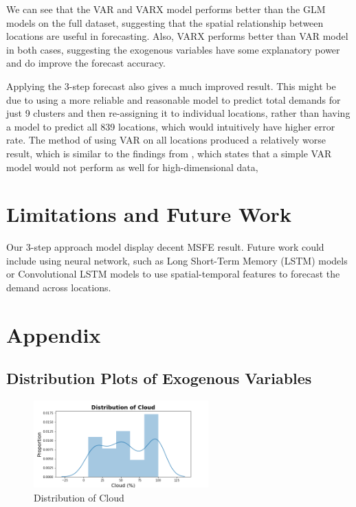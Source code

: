\documentclass[12pt, letterpaper] {article}
\begin{document}
\noindent We can see that the VAR and VARX model performs better than the GLM models on the full dataset, suggesting that the spatial relationship between locations are useful in forecasting. Also, VARX performs better than VAR model in both cases, suggesting the exogenous variables have some explanatory power and do improve the forecast accuracy. 

\noindent Applying the 3-step forecast also gives a much improved result. This might be due to using a more reliable and reasonable model to predict total demands for just 9 clusters and then re-assigning it to individual locations, rather than having a model to predict all 839 locations, which would intuitively have higher error rate. The method of using VAR on all locations produced a relatively worse result, which is similar to the findings from \cite{Abolfazl2017}, which states that a simple VAR model would not perform as well for high-dimensional data,  

\section{Limitations and Future Work}
Our 3-step approach model display decent MSFE result. Future work could include using neural network, such as Long Short-Term Memory (LSTM) models or Convolutional LSTM models to use spatial-temporal features to forecast the demand across locations.

\section{Appendix}
\subsection{Distribution Plots of Exogenous Variables}
\begin{figure}[H]
    \centering
    \includegraphics[width=0.6\textwidth, height=0.3\textheight]{Images/distplot_cloud.png}
    \caption{Distribution of Cloud}
    \label{fig:Distribution of Cloud}
\end{figure}
\end{document}
